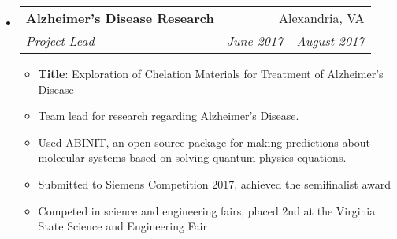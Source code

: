 \documentclass[letterpaper,11pt]{article}
\makeatletter
\newcommand{\resitem}[1]{\item #1 \vspace{-2pt}}
\newcommand{\ressubheading}[4]{
\begin{tabular*}{7.0in}{l@{\extracolsep{\fill}}r}
		\textbf{#1} & #2 \\
		\textit{#3} & \textit{#4} \\
\end{tabular*}\vspace{-6pt}}
\makeatother
\begin{document}
\begin{itemize}
\begin{itemize}
	\end{itemize}
\item
	\ressubheading{Alzheimer's Disease Research}{Alexandria, VA}{Project Lead}{June 2017 - August 2017}
	\begin{itemize}
	    \resitem{\textbf{Title}: Exploration of Chelation Materials for Treatment of Alzheimer's Disease}
		\resitem{Team lead for research regarding Alzheimer's Disease.}
		\resitem{Used ABINIT, an open-source package for making predictions about molecular systems based on solving quantum physics equations.}
		\resitem{Submitted to Siemens Competition 2017, achieved the semifinalist award}
		\resitem{Competed in science and engineering fairs, placed 2nd at the Virginia State Science and Engineering Fair}
	\end{itemize}
	
\end{itemize}
\end{document}
